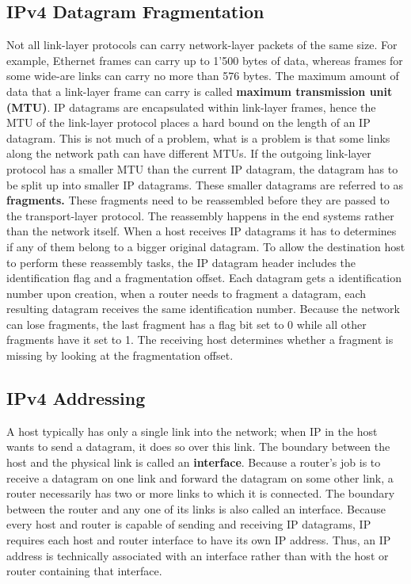 \subsection{IPv4 Datagram Fragmentation}
Not all link-layer protocols can carry network-layer packets of the same size. For example, Ethernet frames can carry up to 1'500 bytes of data, whereas frames for some wide-are links can carry no more than 576 bytes. The maximum amount of data that a link-layer frame can carry is called \textbf{maximum transmission unit (MTU)}. IP datagrams are encapsulated within link-layer frames, hence the MTU of the link-layer protocol places a hard bound on the length of an IP datagram. This is not much of a problem,  what is a problem is that some links along the network path can have different MTUs. If the outgoing link-layer protocol has a smaller MTU than the current IP datagram, the datagram has to be split up into smaller IP datagrams. These smaller datagrams are referred to as \textbf{fragments.} These fragments need to be reassembled before they are passed to the transport-layer protocol. The reassembly happens in the end systems rather than the network itself. When a host receives IP datagrams it has to determines if any of them belong to a bigger original datagram. To allow the destination host to perform these reassembly tasks, the IP datagram header includes the identification flag and a fragmentation offset. Each datagram gets a identification number upon creation, when a router needs to fragment a datagram, each resulting datagram receives the same identification number. Because the network can lose fragments, the last fragment has a flag bit set to 0 while all other fragments have it set to 1. The receiving host determines whether a fragment is missing by looking at the fragmentation offset.

\subsection{IPv4 Addressing}
A host typically has only a single link into the network; when IP in the host wants to send a datagram, it does so over this link. The boundary between the host and the physical link is called an \textbf{interface}. Because a router's job is to receive a datagram on one link and forward the datagram on some other link, a router necessarily has two or more links to which it is connected. The boundary between the router and any one of its links is also called an interface. Because every host and router is capable of sending and receiving IP datagrams, IP requires each host and router interface to have its own IP address. Thus, an IP address is technically associated with an interface rather than with the host or router containing that interface.\vspace{.3cm}\\

